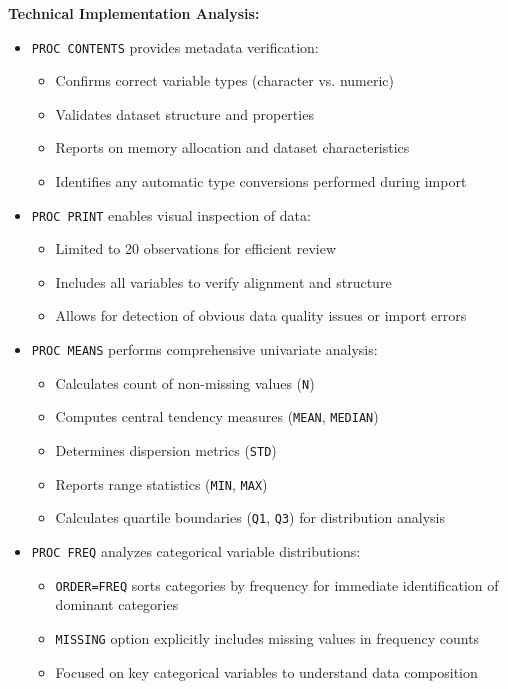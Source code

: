 \documentclass{article}
\begin{document}
\noindent
\textbf{Technical Implementation Analysis:}
\begin{itemize}[leftmargin=*]
    \item \texttt{PROC CONTENTS} provides metadata verification:
    \begin{itemize}
        \item Confirms correct variable types (character vs. numeric)
        \item Validates dataset structure and properties
        \item Reports on memory allocation and dataset characteristics
        \item Identifies any automatic type conversions performed during import
    \end{itemize}

    \item \texttt{PROC PRINT} enables visual inspection of data:
    \begin{itemize}
        \item Limited to 20 observations for efficient review
        \item Includes all variables to verify alignment and structure
        \item Allows for detection of obvious data quality issues or import errors
    \end{itemize}

    \item \texttt{PROC MEANS} performs comprehensive univariate analysis:
    \begin{itemize}
        \item Calculates count of non-missing values (\texttt{N})
        \item Computes central tendency measures (\texttt{MEAN}, \texttt{MEDIAN})
        \item Determines dispersion metrics (\texttt{STD})
        \item Reports range statistics (\texttt{MIN}, \texttt{MAX})
        \item Calculates quartile boundaries (\texttt{Q1}, \texttt{Q3}) for distribution analysis
    \end{itemize}

    \item \texttt{PROC FREQ} analyzes categorical variable distributions:
    \begin{itemize}
        \item \texttt{ORDER=FREQ} sorts categories by frequency for immediate identification of dominant categories
        \item \texttt{MISSING} option explicitly includes missing values in frequency counts
        \item Focused on key categorical variables to understand data composition
    \end{itemize}
\end{itemize}
\end{document}
